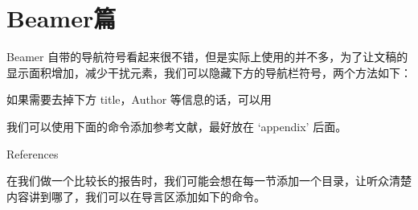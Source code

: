%
%
%
%


\section{Beamer篇}



Beamer
自带的导航符号看起来很不错，但是实际上使用的并不多，为了让文稿的显示面积增加，减少干扰元素，我们可以隐藏下方的导航栏符号，两个方法如下：

\begin{texinlist}
\beamertemplatenavigationsymbolsempty %
\end{texinlist}

如果需要去掉下方 title，Author 等信息的话，可以用

\begin{texinlist}
\end{texinlist}



我们可以使用下面的命令添加参考文献，最好放在 `appendix' 后面。

\begin{texinlist}
\begin{frame}[allowframebreaks]{References}
\def\newblock{}


\end{frame}
\end{texinlist}



在我们做一个比较长的报告时，我们可能会想在每一节添加一个目录，让听众清楚内容讲到哪了，我们可以在导言区添加如下的命令。

